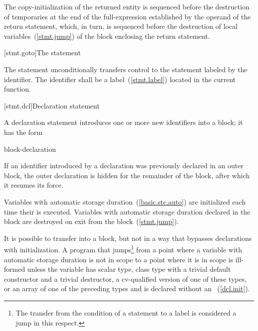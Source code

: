 \pnum
The copy-initialization of the returned entity is sequenced before the
destruction of temporaries at the end of the full-expression established
by the operand of the return statement, which, in turn, is sequenced
before the destruction of local variables~(\ref{stmt.jump}) of the block
enclosing the return statement.

[stmt.goto]{The  statement}%

\pnum
The  statement unconditionally transfers control to the
statement labeled by the identifier. The identifier shall be a
%
label~(\ref{stmt.label}) located in the current function.

[stmt.dcl]{Declaration statement}%

\pnum
A declaration statement introduces one or more new identifiers into a
block; it has the form

\begin{bnf}
\br
    block-declaration
\end{bnf}

If an identifier introduced by a declaration was previously declared in
an outer block,
%
%
%
the outer declaration is hidden for the remainder of the block, after
which it resumes its force.

\pnum
{}%
%
Variables with automatic storage duration~(\ref{basic.stc.auto}) are
initialized each time their  is executed.
%
Variables with automatic storage duration declared in the block are
destroyed on exit from the block~(\ref{stmt.jump}).

\pnum
{}%
%
It is possible to transfer into a block, but not in a way that bypasses
declarations with initialization. A program that jumps\footnote{The transfer from the condition of a  statement to a
 label is considered a jump in this respect.}
from a point where a variable with automatic storage duration is
not in scope to a point where it is in scope is ill-formed unless the
variable has scalar type, class type with a trivial default constructor and a trivial destructor, a cv-qualified version of one of these types, or an array of one of the preceding types and is declared without an
~(\ref{dcl.init}).
\enterexample

